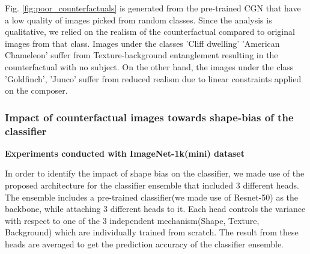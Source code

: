 Fig. \ref{fig:poor_counterfactuals} is generated from the pre-trained CGN that have a low quality of images picked from random classes. Since the analysis is qualitative, we relied on the realism of the counterfactual compared to original images from that class.
Images under the classes 'Cliff dwelling' 'American Chameleon' suffer from Texture-background entanglement resulting in the counterfactual with no subject. On the other hand, the images under the class 'Goldfinch', 'Junco' suffer from reduced realism due to linear constraints applied on the composer.





\subsubsection{Impact of counterfactual images towards shape-bias of the classifier}

\textbf{Experiments conducted with ImageNet-1k(mini) dataset}
\label{section:textshapebg}

In order to identify the impact of shape bias on the classifier, we made use of the proposed architecture for the classifier ensemble that included 3 different heads. The ensemble includes a pre-trained classifier(we made use of Resnet-50) as the backbone, while attaching 3 different heads to it. Each head controls the variance with respect to one of the 3 independent mechanism(Shape, Texture, Background) which are individually trained from scratch. The result from these heads are averaged to get the prediction accuracy of the classifier ensemble.

